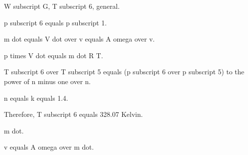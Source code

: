 W subscript G, T subscript 6, general.

p subscript 6 equals p subscript 1.

m dot equals V dot over v equals A omega over v.

p times V dot equals m dot R T.

T subscript 6 over T subscript 5 equals (p subscript 6 over p subscript 5) to the power of n minus one over n.

n equals k equals 1.4.

Therefore, T subscript 6 equals 328.07 Kelvin.

m dot.

v equals A omega over m dot.